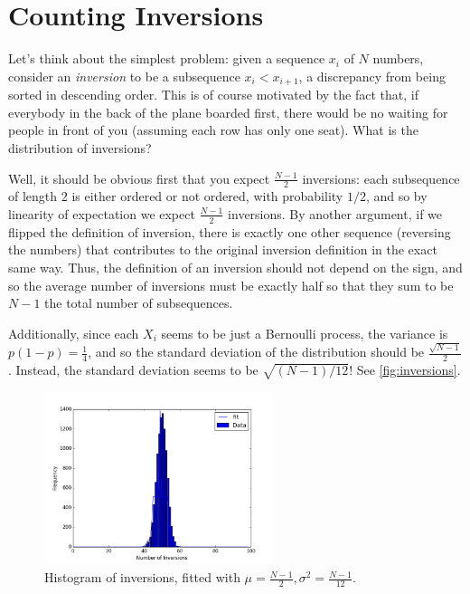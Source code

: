 \documentclass[12pt]{report}
\begin{document}
\section{Counting Inversions}

Let's think about the simplest problem: given a sequence $x_i$ of $N$ numbers,
consider an \emph{inversion} to be a subsequence $x_i < x_{i + 1}$, a
discrepancy from being sorted in descending order. This is of course motivated
by the fact that, if everybody in the back of the plane boarded first, there
would be no waiting for people in front of you (assuming each row has only one
seat). What is the distribution of inversions?

Well, it should be obvious first that you expect $\frac{N - 1}{2}$ inversions:
each subsequence of length $2$ is either ordered or not ordered, with
probability $1/2$, and so by linearity of expectation we expect $\frac{N -
1}{2}$ inversions. By another argument, if we flipped the definition of
inversion, there is exactly one other sequence (reversing the numbers) that
contributes to the original inversion definition in the exact same way. Thus,
the definition of an inversion should not depend on the sign, and so the average
number of inversions must be exactly half so that they sum to be $N - 1$ the
total number of subsequences.

Additionally, since each $X_i$ seems to be  just a Bernoulli process, the
variance is $p(1 - p) = \frac{1}{4}$, and so the standard deviation of the
distribution should be $\frac{\sqrt{N - 1}}{2}$. Instead, the standard deviation
seems to be $\sqrt{(N - 1) / 12}$! See \autoref{fig:inversions}.
\begin{figure}[t]
    \centering
    \includegraphics[width=0.6\textwidth]{plane_boarding/inversions.png}
    \caption{Histogram of inversions, fitted with $\mu = \frac{N - 1}{2},
    \sigma^2 = \frac{N - 1}{12}$.}\label{fig:inversions}
\end{figure}
\end{document}
